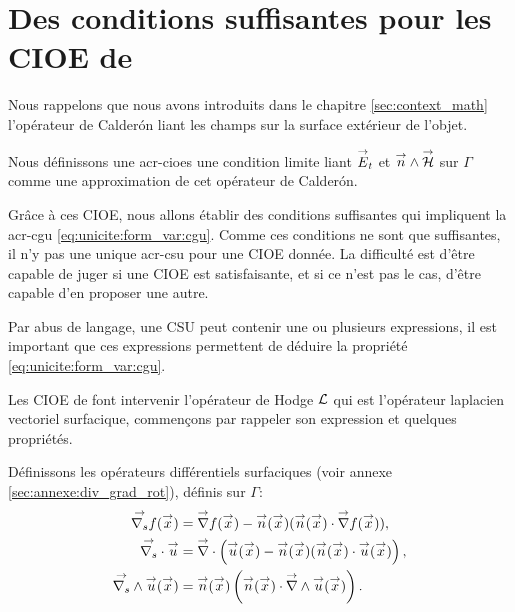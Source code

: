 \section[Des CSU pour les CIOE de Stupfel et Poget 2011]{Des conditions suffisantes pour les CIOE de \cite{stupfel_sufficient_2011}}

  Nous rappelons que nous avons introduits dans le chapitre \ref{sec:context_math} l'opérateur de Calderón liant les champs sur la surface extérieur de l'objet. 


  Nous définissons une \glspl{acr-cioe} une condition limite liant \(\vE_t\) et \(\vn\pvect\vH\) sur \(\Gamma\) comme une approximation de cet opérateur de Calderón.

  Grâce à ces CIOE, nous allons établir des conditions suffisantes qui impliquent la \gls{acr-cgu} \eqref{eq:unicite:form_var:cgu}.
  Comme ces conditions ne sont que suffisantes, il n'y pas une unique \gls{acr-csu} pour une CIOE donnée.
  La difficulté est d'être capable de juger si une CIOE est satisfaisante, et si ce n'est pas le cas, d'être capable d'en proposer une autre.

  Par abus de langage, une CSU peut contenir une ou plusieurs expressions, il est important que ces expressions permettent de déduire la propriété \eqref{eq:unicite:form_var:cgu}.

  Les CIOE de \cite{stupfel_sufficient_2011} font intervenir l'opérateur de Hodge \(\LL\) qui est l'opérateur laplacien vectoriel surfacique, commençons par rappeler son expression et quelques propriétés.

  Définissons les opérateurs différentiels surfaciques (voir annexe \ref{sec:annexe:div_grad_rot}), définis sur \(\Gamma\):
  \begin{align*}
      \vgrads{f}(\vx) &= \vgrad{f}(\vx) - \vn(\vx) (\vn(\vx) \cdot \vgrad{f}(\vx)),
      \\
      \vdivs{\vu} &= \vdiv\left(\vu(\vx) - \vn(\vx) (\vn(\vx) \cdot \vu(\vx)\right),
      \\
      \vrots{\vu}(\vx) &= \vn(\vx)\left(\vn(\vx) \cdot \vrot{\vu}(\vx)\right).
  \end{align*}


